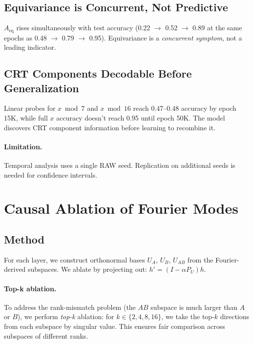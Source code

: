 \documentclass[11pt,a4paper]{article}
\theoremstyle{definition}
\theoremstyle{remark}
\newcommand{\Aeq}{A_{\mathrm{eq}}}
\begin{document}
\subsection{Equivariance is Concurrent, Not Predictive}

$\Aeq$ rises simultaneously with test accuracy (0.22 $\to$ 0.52 $\to$ 0.89 at the same epochs as 0.48 $\to$ 0.79 $\to$ 0.95). Equivariance is a \emph{concurrent symptom}, not a leading indicator.

\subsection{CRT Components Decodable Before Generalization}

Linear probes for $x \bmod 7$ and $x \bmod 16$ reach 0.47--0.48 accuracy by epoch 15K, while full $x$ accuracy doesn't reach 0.95 until epoch 50K. The model discovers CRT component information before learning to recombine it.

\paragraph{Limitation.} Temporal analysis uses a single RAW seed. Replication on additional seeds is needed for confidence intervals.

\section{Causal Ablation of Fourier Modes}
\label{sec:causal}

\subsection{Method}

For each layer, we construct orthonormal bases $U_A$, $U_B$, $U_{AB}$ from the Fourier-derived subspaces. We ablate by projecting out: $h' = (I - \alpha P_U) h$.

\paragraph{Top-k ablation.} To address the rank-mismatch problem (the $AB$ subspace is much larger than $A$ or $B$), we perform \emph{top-k} ablation: for $k \in \{2, 4, 8, 16\}$, we take the top-$k$ directions from each subspace by singular value. This ensures fair comparison across subspaces of different ranks.
\end{document}
